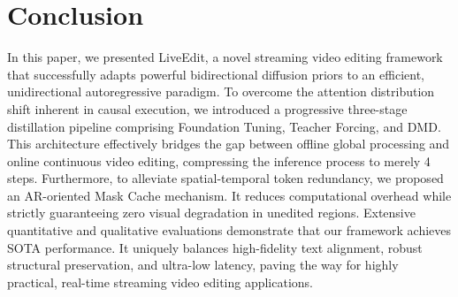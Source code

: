 \section{Conclusion}
\label{sec:conclusion}

 In this paper, we presented LiveEdit, a novel streaming video editing framework that successfully adapts powerful bidirectional diffusion priors to an efficient, unidirectional autoregressive paradigm. To overcome the attention distribution shift inherent in causal execution, we introduced a progressive three-stage distillation pipeline comprising Foundation Tuning, Teacher Forcing, and DMD. This architecture effectively bridges the gap between offline global processing and online continuous video editing, compressing the inference process to merely 4 steps. Furthermore, to alleviate spatial-temporal token redundancy, we proposed an AR-oriented Mask Cache mechanism. It reduces computational overhead while strictly guaranteeing zero visual degradation in unedited regions. Extensive quantitative and qualitative evaluations demonstrate that our framework achieves SOTA performance. It uniquely balances high-fidelity text alignment, robust structural preservation, and ultra-low latency, paving the way for highly practical, real-time streaming video editing applications.
